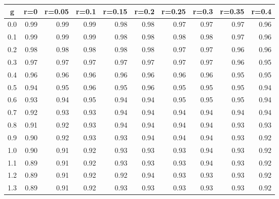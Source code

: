 %
\begin{table}[!tbp]
 \begin{center}
 \begin{tabular}{rrrrrrrrrr}\hline\hline
\multicolumn{1}{c}{g}&\multicolumn{1}{c}{r=0}&\multicolumn{1}{c}{r=0.05}&\multicolumn{1}{c}{r=0.1}&\multicolumn{1}{c}{r=0.15}&\multicolumn{1}{c}{r=0.2}&\multicolumn{1}{c}{r=0.25}&\multicolumn{1}{c}{r=0.3}&\multicolumn{1}{c}{r=0.35}&\multicolumn{1}{c}{r=0.4}\tabularnewline
\hline
0.0&0.99&0.99&0.99&0.98&0.98&0.97&0.97&0.97&0.96\tabularnewline
0.1&0.99&0.99&0.99&0.98&0.98&0.98&0.98&0.97&0.96\tabularnewline
0.2&0.98&0.98&0.98&0.98&0.98&0.97&0.97&0.96&0.96\tabularnewline
0.3&0.97&0.97&0.97&0.97&0.97&0.97&0.97&0.96&0.95\tabularnewline
0.4&0.96&0.96&0.96&0.96&0.96&0.96&0.96&0.95&0.95\tabularnewline
0.5&0.94&0.95&0.96&0.95&0.96&0.95&0.95&0.95&0.94\tabularnewline
0.6&0.93&0.94&0.95&0.94&0.94&0.95&0.95&0.95&0.94\tabularnewline
0.7&0.92&0.93&0.93&0.94&0.94&0.94&0.94&0.94&0.94\tabularnewline
0.8&0.91&0.92&0.93&0.94&0.94&0.94&0.94&0.93&0.93\tabularnewline
0.9&0.90&0.92&0.93&0.93&0.94&0.94&0.94&0.93&0.92\tabularnewline
1.0&0.90&0.91&0.92&0.93&0.93&0.93&0.94&0.93&0.92\tabularnewline
1.1&0.89&0.91&0.92&0.93&0.93&0.93&0.94&0.93&0.92\tabularnewline
1.2&0.89&0.91&0.92&0.92&0.94&0.93&0.93&0.93&0.92\tabularnewline
1.3&0.89&0.91&0.92&0.93&0.93&0.93&0.93&0.93&0.92\tabularnewline
\hline
\end{tabular}

\end{center}

\end{table}

